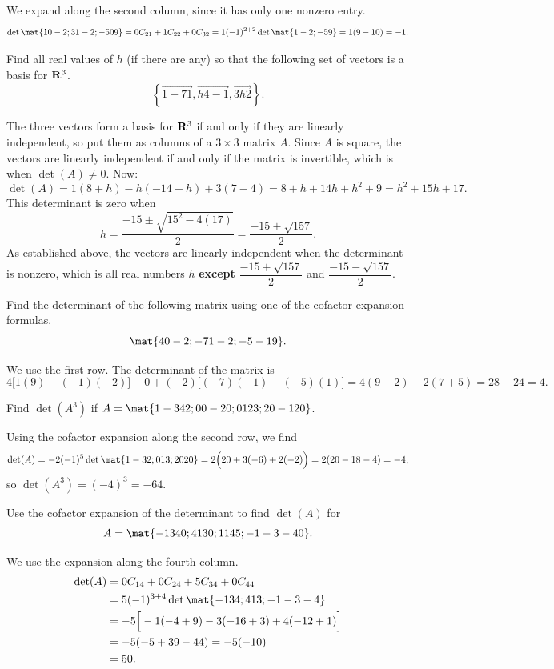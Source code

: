 \begin{problems}
\begin{solution}
We expand along the second column, since it has only one nonzero entry.
\[\det\mat{1 0 -2; 3 1 -2; -5 0 9} = 0C_{21} + 1 C_{22} + 0C_{32}
  = 1 (-1)^{2+2} \det\mat{1 -2; -5 9} = 1(9-10) = -1.
  \]
\end{solution}

\problem %
Find all real values of $h$ (if there are any) so that the following set of
vectors is a basis for ${\bf R}^{3}$.
\[\left\{\vec{1 -7 1}, \vec{h 4 -1}, \vec{3 h 2}\right\}.\]
\begin{solution}
  The three vectors form a basis for ${\bf R}^{3}$ if and only if they are
  linearly independent, so put them as columns of a $3 \times 3$ matrix $A$.
  Since $A$ is square, the vectors are linearly independent if and only
  if the matrix is invertible, which is when $\det(A) \neq 0$.  Now:
  \[\det(A) = 1(8+h) - h(-14-h) + 3(7-4) = 8+h+14h+h^2 + 9
    = h^2+15h+17.\]
  This determinant is zero when
  \[h = \dfrac{-15 \pm \sqrt{15^2-4(17)}}{2} = \dfrac{-15 \pm \sqrt{157}}{2}.\]
  As established above, the vectors are linearly independent when the determinant
  is nonzero, which is all real numbers $h$ {\bf except} %
  $\dfrac{-15 + \sqrt{157}}{2}$ and $\dfrac{-15 - \sqrt{157}}{2}$.
\end{solution}

\problem %
Find the determinant of the following matrix using one of the cofactor expansion formulas.
\[\mat{4 0 -2; -7 1 -2; -5 -1 9}.\]
\begin{solution}
We use the first row.  The determinant of the matrix is
\[
  4\Big[1(9)-(-1)(-2)\Big] - 0 + (-2)\Big[(-7)(-1)-(-5)(1)\Big]
  = 4(9-2) - 2(7+5) = 28-24 = 4.
\]
\end{solution}

\problem %
  Find $\det(A^3)$ if $A= \mat{1 -3 4 2; 0 0 -2 0; 0 1 2 3; 2 0 -1 20}$.  

  \begin{solution}
    Using the cofactor expansion along the second row, we find
    \[\det(A)=-2(-1)^5\det\mat{1 -3 2; 0 1 3; 2 0 20}
      = 2\Big(20+3(-6)+2(-2)\Big)=2(20-18-4)=-4,\] so
    $\det(A^3)=(-4)^3= -64$.
  \end{solution}

\problem %
Use the cofactor expansion of the determinant to find $\det(A)$ for
\[A = \mat{-1 3 4 0; 4 1 3 0; 1 1 4 5; -1 -3 -4 0}.\]
\begin{solution}
We use the expansion along the fourth column.
\begin{align*}
  \det(A)
  & = 0C_{14} + 0C_{24} + 5 C_{34} + 0 C_{44} \\
  & = 5 (-1)^{3+4} \det\mat{-1 3 4; 4 1 3; -1 -3 -4} \\
  & = -5\Big[-1(-4+9)-3(-16+3)+4(-12+1)\Big] \\
  & = -5(-5+39-44) = -5(-10) \\
  & = 50.
\end{align*}  
\end{solution}


\end{problems}
